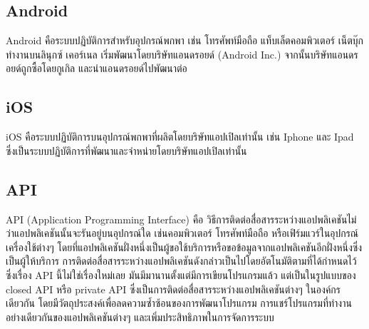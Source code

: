     \subsection{Android}
        Android คือระบบปฏิบัติการสำหรับอุปกรณ์พกพา เช่น โทรศัพท์มือถือ แท็บเล็ตคอมพิวเตอร์ เน็ตบุ๊ก ทำงานบนลินุกซ์ เคอร์เนล เริ่มพัฒนาโดยบริษัทแอนดรอยด์ (Android Inc.) จากนั้นบริษัทแอนดรอยด์ถูกซื้อโดยกูเกิล และนำแอนดรอยด์ไปพัฒนาต่อ\cite{android}

    \subsection{iOS}
        iOS คือระบบปฏิบัติการบนอุปกรณ์พกพาที่ผลิตโดยบริษัทแอปเปิลเท่านั้น เช่น Iphone และ Ipad ซึ่งเป็นระบบปฏิบัติการที่พัฒนาและจำหน่ายโดยบริษัทแอปเปิลเท่านั้น\cite{ios}

    \subsection{API}
        API (Application Programming Interface) คือ วิธีการติดต่อสื่อสารระหว่างแอปพลิเคชันไม่ว่าแอปพลิเคชันนั้นจะรันอยู่บนอุปกรณ์ใด เช่นคอมพิวเตอร์ โทรศัพท์มือถือ หรือเฟิร์มแวร์ในอุปกรณ์เครื่องใช้ต่างๆ โดยที่แอปพลิเคชันฝั่งหนึ่งเป็นผู้ขอใช้บริการหรือขอข้อมูลจากแอปพลิเคชันอีกฝั่งหนึ่งซึ่งเป็นผู้ให้บริการ การติดต่อสื่อสารระหว่างแอปพลิเคชันดังกล่าวเป็นไปโดยอัตโนมัติตามที่ได้กำหนดไว้ ซึ่งเรื่อง API นี้ไม่ใช่เรื่องใหม่เลย มันมีมานานตั้งแต่มีการเขียนโปรแกรมแล้ว แต่เป็นในรูปแบบของ closed API หรือ private API ซึ่งเป็นการติดต่อสื่อสารระหว่างแอปพลิเคชันต่างๆ ในองค์กรเดียวกัน โดยมีวัตถุประสงค์เพื่อลดความซ้ำซ้อนของการพัฒนาโปรแกรม การแชร์โปรแกรมที่ทำงานอย่างเดียวกันของแอปพลิเคชันต่างๆ และเพิ่มประสิทธิภาพในการจัดการระบบ \cite{api}

